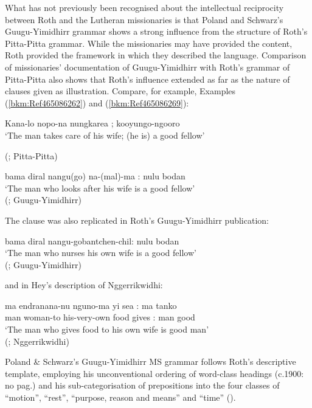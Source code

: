 What has not previously been recognised about the intellectual reciprocity between Roth and the Lutheran missionaries is that Poland and Schwarz’s Guugu-Yimidhirr grammar \citeyearpar{schwarz_koko_1900} shows a strong influence from the structure of Roth’s Pitta-Pitta grammar. While the missionaries may have provided the content, Roth provided the framework in which they described the language. Comparison of missionaries' documentation of Guugu-Yimidhirr \citep{schwarz_koko_1900} with Roth’s grammar of Pitta-Pitta \citeyearpar{roth_ethnological_1897} also shows that Roth’s influence extended as far as the nature of clauses given as illustration. Compare, for example, Examples (\ref{bkm:Ref465086262}) and (\ref{bkm:Ref465086269}):

\ea
\label{bkm:Ref465086262}Kana-lo nopo-na nungkarea ; kooyungo-ngooro\\
\glt `The man takes care of his wife; (he is) a good fellow'

(\citealt[24]{roth_ethnological_1897}; Pitta-Pitta)
\z

\ea
       \label{bkm:Ref465086269}bama diral nangu(go) na-(mal)-ma : nulu bodan\\
\glt `The man who looks after his wife is a good fellow' \\

(\citealt[no pag]{schwarz_koko_1900}; Guugu-Yimidhirr)
\z

The clause was also replicated in Roth’s Guugu-Yimidhirr publication:

\ea
        \label{bkm:Ref339469326}bama diral nangu-gobantchen-chil: nulu bodan\\
\glt `The man who nurses his own wife is a good fellow' \\
(\citealt[18]{roth_structure_1901}; Guugu-Yimidhirr)
\z

and in Hey’s description of Nggerrikwidhi:

\ea
\gll     ma  endranana-nu   nguno-ma    yi    sea  : ma tanko\\
    man woman-to   his-very-own food gives : man good\\
\glt `The man who gives food to his own wife is good man' \\
(\citealt[13]{hey_elementary_1903}; Nggerrikwidhi)
\z

Poland \& Schwarz’s Guugu-Yimidhirr MS grammar follows Roth’s descriptive template, employing his unconventional ordering of word-class headings (c.1900: no pag.) and his sub-categorisation of prepositions into the four classes of “motion'', “rest'', “purpose, reason and means” and “time” ().

